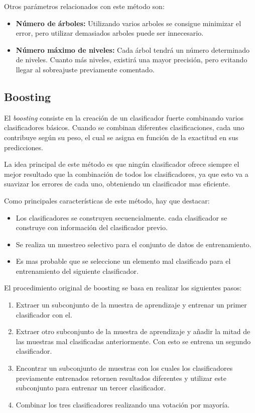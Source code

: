 Otros parámetros relacionados con este método son:
\begin{itemize}
  \item \textbf{Número de árboles: } Utilizando varios arboles se consigue minimizar el error, pero utilizar demasiados arboles puede ser innecesario.
  \item \textbf{Número máximo de niveles: } Cada árbol tendrá un número determinado de niveles. Cuanto más niveles, existirá una mayor precisión, pero evitando llegar al sobreajuste previamente comentado.
\end{itemize}




\subsection{Boosting}
El \textit{boosting} consiste en la creación de un clasificador fuerte combinando varios clasificadores básicos. Cuando se combinan diferentes clasificaciones, cada uno contribuye según su peso, el cual se asigna en función de la exactitud en sus predicciones. 

La idea principal de este método es que ningún clasificador ofrece siempre el mejor resultado que la combinación de todos los clasificadores, ya que esto va a suavizar los errores de cada uno, obteniendo un clasificador mas eficiente. 

Como principales características de este método, hay que destacar:
\begin{itemize}
  \item Los clasificadores se construyen secuencialmente. cada clasificador se construye con información del clasificador previo.
  \item Se realiza un muestreo selectivo para el conjunto de datos de entrenamiento.
  \item Es mas probable que se seleccione un elemento mal clasificado para el entrenamiento del siguiente clasificador.
\end{itemize}


El procedimiento original de boosting se basa en realizar los siguientes pasos:

\begin{enumerate}
\item Extraer un subconjunto de la muestra de aprendizaje y entrenar un primer clasificador con el. 
\item Extraer otro subconjunto de la muestra de aprendizaje y añadir la mitad de las muestras mal clasificadas anteriormente. Con esto se entrena un segundo clasificador. 
\item Encontrar un subconjunto de muestras con los cuales los clasificadores previamente entrenados retornen resultados diferentes y utilizar este subconjunto para entrenar un tercer clasificador.
\item Combinar los tres clasificadores realizando una votación por mayoría. 
\end{enumerate}

